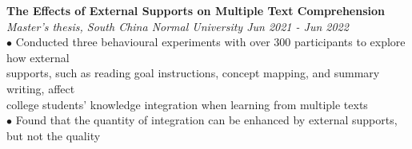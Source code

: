 \documentclass[a4paper, 10pt]{article}
\begin{document}
\textbf{The Effects of External Supports on Multiple Text Comprehension} \\
\textit{Master's thesis, South China Normal University \hfill Jun 2021 - Jun 2022} \\
$\bullet$\hspace{1.8em} Conducted three behavioural experiments with over 300 participants to explore how external \\ \indent\hspace{2.3em} supports, such as reading goal instructions, concept mapping, and summary writing, affect  \\ \indent\hspace{2.3em} college students' knowledge integration when learning from multiple texts \\
$\bullet$\hspace{1.8em} Found that the quantity of integration can be enhanced by external supports, but not the quality \\

\bigskip






\end{document}
